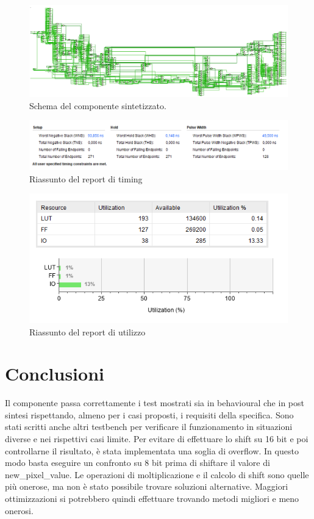 \documentclass{article}
\begin{document}
\begin{figure}[h]
    \includegraphics[width=\textwidth]{schema.png}
    \centering
    \caption{Schema del componente sintetizzato.}
\end{figure}

\begin{figure}[h]
    \includegraphics[width=\textwidth]{timing.png}
    \centering
    \caption{Riassunto del report di timing}
\end{figure}

\begin{figure}[h]
    \includegraphics[scale=0.5]{utilization.png}
    \centering
    \caption{Riassunto del report di utilizzo}
\end{figure}

\pagebreak
\section{Conclusioni}
Il componente passa correttamente i test mostrati sia in behavioural che in post sintesi rispettando, almeno per i casi proposti, i requisiti della specifica. Sono stati scritti anche altri testbench per verificare il funzionamento in situazioni diverse e nei rispettivi casi limite. Per evitare di effettuare lo shift su 16 bit e poi controllarne il risultato, è stata implementata una soglia di overflow. In questo modo basta eseguire un confronto su 8 bit prima di shiftare il valore di new\_pixel\_value. Le operazioni di moltiplicazione e il calcolo di shift sono quelle più onerose, ma non è stato possibile trovare soluzioni alternative. Maggiori ottimizzazioni si potrebbero quindi effettuare trovando metodi migliori e meno onerosi.

\pagebreak
\printbibliography
\end{document}
